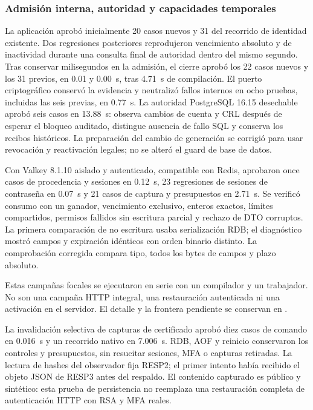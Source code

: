 \subsubsection{Admisión interna, autoridad y capacidades temporales}

La aplicación aprobó inicialmente 20 casos nuevos y 31 del recorrido de identidad
existente. Dos regresiones posteriores reprodujeron vencimiento absoluto y de
inactividad durante una consulta final de autoridad dentro del mismo segundo.
Tras conservar milisegundos en la admisión, el cierre aprobó los 22 casos nuevos
y los 31 previos, en 0.01 y 0.00~s, tras 4.71~s de compilación.
El puerto criptográfico conservó la evidencia y neutralizó fallos internos en
ocho pruebas, incluidas las seis previas, en 0.77~s. La autoridad PostgreSQL
16.15 desechable aprobó seis casos en 13.88~s: observa cambios de cuenta y CRL
después de esperar el bloqueo auditado, distingue ausencia de fallo SQL y
conserva los recibos históricos. La preparación del cambio de generación se
corrigió para usar revocación y reactivación legales; no se alteró el guard de
base de datos.

Con Valkey 8.1.10 aislado y autenticado, compatible con Redis, aprobaron once
casos de procedencia y sesiones en 0.12~s, 23 regresiones de sesiones de
contraseña en 0.07~s y 21 casos de captura y presupuestos en 2.71~s. Se verificó
consumo con un ganador, vencimiento exclusivo, enteros exactos, límites
compartidos, permisos fallidos sin escritura parcial y rechazo de DTO corruptos.
La primera comparación de no escritura usaba serialización RDB; el diagnóstico
mostró campos y expiración idénticos con orden binario distinto. La comprobación
corregida compara tipo, todos los bytes de campos y plazo absoluto.

Estas campañas focales se ejecutaron en serie con un compilador y un trabajador.
No son una campaña HTTP integral, una restauración autenticada ni una activación
en el servidor. El detalle y la frontera pendiente se conservan en
.


La invalidación selectiva de capturas de certificado aprobó diez casos de
comando en 0.016~s y un recorrido nativo en 7.006~s. RDB, AOF y reinicio
conservaron los controles y presupuestos, sin resucitar sesiones, MFA o
capturas retiradas. La lectura de hashes del observador fija RESP2; el primer
intento había recibido el objeto JSON de RESP3 antes del respaldo. El contenido
capturado es público y sintético: esta prueba de persistencia no reemplaza una
restauración completa de autenticación HTTP con RSA y MFA reales.


